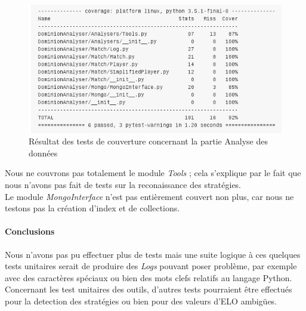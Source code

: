\begin{figure}
  \begin{center}
    \includegraphics[width=\textwidth,height=\textheight,keepaspectratio]{./coverage_python_code}
  \end{center}
  \caption{Résultat des tests de couverture concernant la partie Analyse des données}
\end{figure}

Nous ne couvrons pas totalement le module \textit{Tools} ; cela s'explique par le fait que nous n'avons pas fait de tests sur la reconaissance des stratégies.\\
Le module \textit{MongoInterface} n'est pas entièrement couvert non plus, car nous ne testons pas la création d'index et de collections.


\paragraph{Conclusions}

Nous n'avons pas pu effectuer plus de tests mais une suite logique à ces quelques tests unitaires serait de produire des \textit{Logs} pouvant poser problème, par exemple avec des caractères spéciaux ou bien des mots clefs relatifs au langage Python. Concernant les test unitaires des outils, d'autres tests pourraient être effectués pour la detection des stratégies ou bien pour des valeurs d'ELO ambigües.


